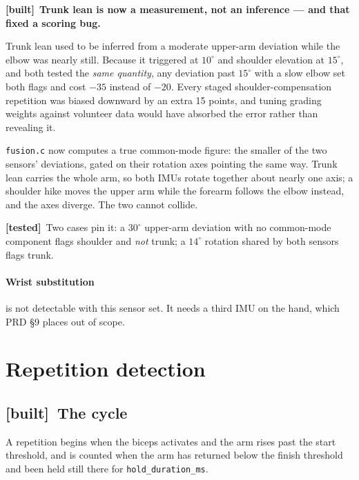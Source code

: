 \documentclass[11pt]{article}
\newcommand{\built}{{\sffamily\scriptsize\color{good}\textbf{[built]}}\ }
\newcommand{\tested}{{\sffamily\scriptsize\color{annot}\textbf{[tested]}}\ }
\begin{document}
\begin{callout}
\built \textbf{Trunk lean is now a measurement, not an inference --- and that
fixed a scoring bug.}

\medskip
Trunk lean used to be inferred from a moderate upper-arm deviation while the
elbow was nearly still. Because it triggered at $10^{\circ}$ and shoulder
elevation at $15^{\circ}$, and both tested the \emph{same quantity}, any
deviation past $15^{\circ}$ with a slow elbow set both flags and cost $-35$
instead of $-20$. Every staged shoulder-compensation repetition was biased
downward by an extra 15 points, and tuning grading weights against volunteer
data would have absorbed the error rather than revealing it.

\medskip
\texttt{fusion.c} now computes a true common-mode figure: the smaller of the
two sensors' deviations, gated on their rotation axes pointing the same way.
Trunk lean carries the whole arm, so both IMUs rotate together about nearly
one axis; a shoulder hike moves the upper arm while the forearm follows the
elbow instead, and the axes diverge. The two cannot collide.

\medskip
\tested Two cases pin it: a $30^{\circ}$ upper-arm deviation with no
common-mode component flags shoulder and \emph{not} trunk; a $14^{\circ}$
rotation shared by both sensors flags trunk.
\end{callout}

\paragraph{Wrist substitution} is not detectable with this sensor set. It
needs a third IMU on the hand, which PRD \S9 places out of scope.

\section{Repetition detection}

\subsection{\built The cycle}

A repetition begins when the biceps activates and the arm rises past the start
threshold, and is counted when the arm has returned below the finish threshold
and been held still there for \texttt{hold\_duration\_ms}.
\end{document}
